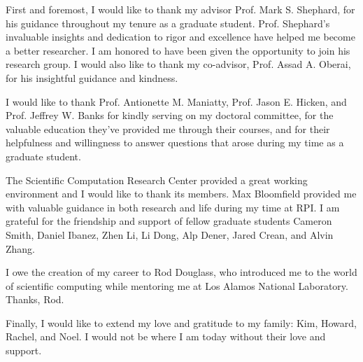 
First and foremost, I would like to thank my advisor
Prof. Mark S. Shephard, for his guidance throughout my tenure
as a graduate student. Prof. Shephard's invaluable insights
and dedication to rigor and excellence have helped me become
a better researcher. I am honored to have been given the
opportunity to join his research group. I would also like
to thank my co-advisor, Prof. Assad A. Oberai, for his
insightful guidance and kindness.

I would like to thank Prof. Antionette M. Maniatty,
Prof. Jason E. Hicken, and Prof. Jeffrey W. Banks for
kindly serving on my doctoral committee, for the valuable
education they've provided me through their courses,
and for their helpfulness and willingness to answer questions
that arose during my time as a graduate student.

The Scientific Computation Research Center provided a
great working environment and I would like to thank its
members. Max Bloomfield provided me with valuable guidance
in both research and life during my time at RPI.
I am grateful for the friendship and support of fellow
graduate students Cameron Smith, Daniel Ibanez, Zhen Li,
Li Dong, Alp Dener, Jared Crean, and Alvin Zhang.

I owe the creation of my career to Rod Douglass, who
introduced me to the world of scientific computing while
mentoring me at Los Alamos National Laboratory.
Thanks, Rod.

Finally, I would like to extend my love and gratitude
to my family: Kim, Howard, Rachel, and Noel. I would not
be where I am today without their love and support.
